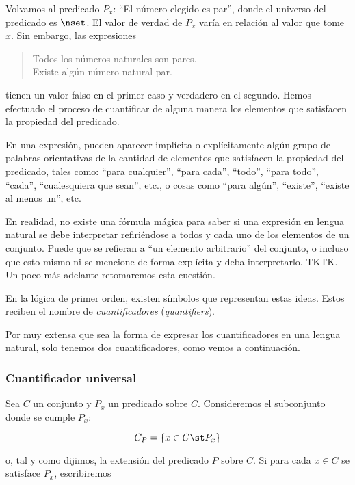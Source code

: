 


Volvamos al predicado $P_x$: ``El número elegido es par'', donde el universo
del predicado es $\nset$. El valor de verdad de $P_x$ varía en relación al
valor que tome $x$. Sin embargo, las expresiones

\begin{quote}
  Todos los números naturales son pares. \\
  Existe algún número natural par.
\end{quote}

\noindent tienen un valor falso en el primer caso y verdadero en el segundo.
Hemos efectuado el proceso de cuantificar de alguna manera los elementos que
satisfacen la propiedad del predicado.

En una expresión, pueden aparecer implícita o explícitamente algún grupo de
palabras orientativas de la cantidad de elementos que satisfacen la
propiedad del predicado, tales como: ``para cualquier'', ``para cada'',
``todo'', ``para todo'', ``cada'', ``cualesquiera que sean'', etc., o cosas
como ``para algún'', ``existe'', ``existe al menos un'', etc.

En realidad, no existe una fórmula mágica para saber si una expresión en
lengua natural se debe interpretar refiriéndose a todos y cada uno de los
elementos de un conjunto. Puede que se refieran a ``un elemento arbitrario''
del conjunto, o incluso que esto mismo ni se mencione de forma explícita y
deba interpretarlo. TKTK. Un poco más adelante retomaremos esta cuestión.

En la lógica de primer orden, existen símbolos que representan estas ideas.
Estos reciben el nombre de \emph{cuantificadores} (\emph{quantifiers}).

Por muy extensa que sea la forma de expresar los cuantificadores en una
lengua natural, solo tenemos dos cuantificadores, como vemos a continuación.





\subsubsection{Cuantificador universal}

Sea $C$ un conjunto y $P_x$ un predicado sobre $C$. Consideremos el
subconjunto donde se cumple $P_x$:

$$ C_P = \{x \in C \st P_x\} $$

\noindent o, tal y como dijimos, la extensión del predicado $P$ sobre $C$.
Si para cada $x \in C$ se satisface $P_x$, escribiremos


